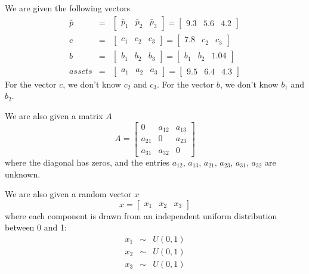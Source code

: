 \documentclass{article}
\begin{document}
We are given the following vectors%
\begin{eqnarray*}
\bar{p} &=&\left[ 
\begin{array}{ccc}
\bar{p}_{1} & \bar{p}_{2} & \bar{p}_{3}%
\end{array}%
\right] =\left[ 
\begin{array}{ccc}
9.3 & 5.6 & 4.2%
\end{array}%
\right] \\
c &=&\left[ 
\begin{array}{ccc}
c_{1} & c_{2} & c_{3}%
\end{array}%
\right] =\left[ 
\begin{array}{ccc}
7.8 & c_{2} & c_{3}%
\end{array}%
\right] \\
b &=&\left[ 
\begin{array}{ccc}
b_{1} & b_{2} & b_{3}%
\end{array}%
\right] =\left[ 
\begin{array}{ccc}
b_{1} & b_{2} & 1.04%
\end{array}%
\right] \\
assets &=&\left[ 
\begin{array}{ccc}
a_{1} & a_{2} & a_{3}%
\end{array}%
\right] =\left[ 
\begin{array}{ccc}
9.5 & 6.4 & 4.3%
\end{array}%
\right]
\end{eqnarray*}%
For the vector $c$, we don't know $c_{2}$ and $c_{3}$. For the vector $b$,
we don't know $b_{1}$ and $b_{2}$.

We are also given a matrix $A$ 
\[
A=\left[ 
\begin{array}{ccc}
0 & a_{12} & a_{13} \\ 
a_{21} & 0 & a_{23} \\ 
a_{31} & a_{32} & 0%
\end{array}%
\right] 
\]%
where the diagonal has zeros, and the entries $a_{12}$, $a_{13}$, $a_{21}$, $%
a_{23}$, $a_{31}$, $a_{32}$ are unknown.

We are also given a random vector $x$%
\[
x=\left[ 
\begin{array}{ccc}
x_{1} & x_{2} & x_{3}%
\end{array}%
\right] 
\]%
where each component is drawn from an independent uniform distribution
between 0 and 1:%
\begin{eqnarray*}
x_{1} &\sim &U\left( 0,1\right) \\
x_{2} &\sim &U\left( 0,1\right) \\
x_{3} &\sim &U\left( 0,1\right)
\end{eqnarray*}
\end{document}
